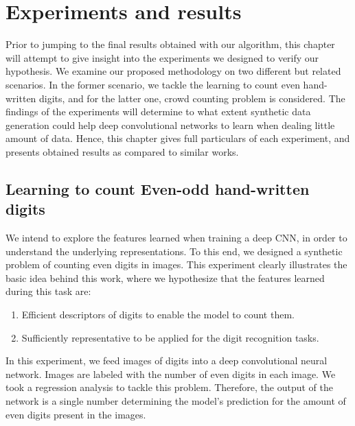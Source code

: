 \newpage
\chapter{Experiments and results}
\label{sec:experiments}

Prior to jumping to the final results obtained with our algorithm, this chapter will attempt to give insight into the experiments we designed to verify our hypothesis. We examine our proposed methodology on two different but related scenarios. In the former scenario, we tackle the learning to count even hand-written digits, and for the latter one, crowd counting problem is considered. The findings of the experiments will determine to what extent synthetic data generation could help deep convolutional networks to learn when dealing little amount of data. Hence, this chapter gives full particulars of each experiment, and presents obtained results as compared to similar works.

\section{Learning to count Even-odd hand-written digits}

We intend to explore the features learned when training a deep CNN, in order to understand the underlying representations. To this end, we designed a synthetic problem of counting even digits in images. This experiment clearly illustrates the basic idea behind this work, where we hypothesize that the features learned during this task are:
\begin{enumerate}
\item Efficient descriptors of digits to enable the model to count them.
\item Sufficiently representative to be applied for the digit recognition tasks. 
\end{enumerate}

In this experiment, we feed images of digits into a deep convolutional neural network. Images are labeled with the number of even digits in each image. We took a regression analysis to tackle this problem. Therefore, the output of the network is a single number determining the model's prediction for the amount of even digits present in the images. 
 

